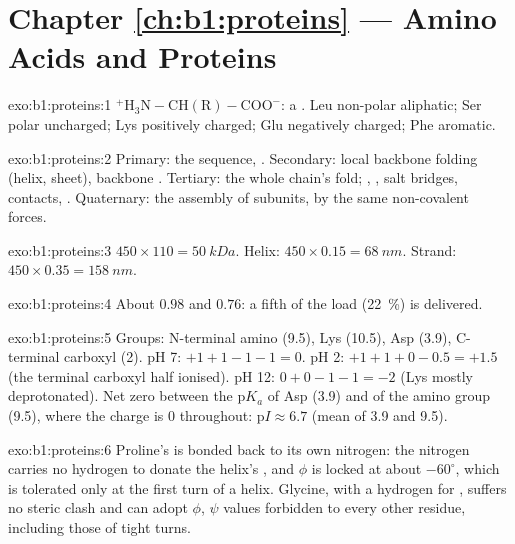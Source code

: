 \section*{Chapter \ref{ch:b1:proteins} --- Amino Acids and Proteins}

\begin{solution}{exo:b1:proteins:1}
$\mathrm{^+H_3N{-}CH(R){-}COO^-}$: a . Leu non-polar
aliphatic; Ser polar uncharged; Lys positively charged; Glu negatively
charged; Phe aromatic.
\end{solution}

\begin{solution}{exo:b1:proteins:2}
Primary: the sequence, . Secondary: local backbone
folding (helix, sheet), backbone . Tertiary: the whole
chain's fold; , , salt bridges,  contacts, . Quaternary: the assembly of
subunits, by the same non-covalent forces.
\end{solution}

\begin{solution}{exo:b1:proteins:3}
$450\times 110 = \qty{50}{kDa}$. Helix: $450\times 0.15 = \qty{68}{nm}$.
Strand: $450\times 0.35 = \qty{158}{nm}$.
\end{solution}

\begin{solution}{exo:b1:proteins:4}
About $0.98$ and $0.76$: a fifth of the load (\qty{22}{\%}) is
delivered.
\end{solution}

\begin{solution}{exo:b1:proteins:5}
Groups: N-terminal amino (9.5), Lys  (10.5), Asp 
(3.9), C-terminal carboxyl (2). pH 7: $+1 + 1 - 1 - 1 = 0$. pH 2:
$+1 + 1 + 0 - 0.5 = +1.5$ (the terminal carboxyl half ionised). pH
12: $0 + 0 - 1 - 1 = -2$ (Lys mostly deprotonated). Net zero between
the p$K_a$ of Asp (3.9) and of the amino group (9.5), where the charge
is $0$ throughout: p$I \approx 6.7$ (mean of 3.9 and 9.5).
\end{solution}

\begin{solution}{exo:b1:proteins:6}
Proline's  is bonded back to its own nitrogen: the nitrogen
carries no hydrogen to donate the helix's , and $\phi$ is
locked at about $-60^\circ$, which is tolerated only at the first turn
of a helix. Glycine, with a hydrogen for , suffers no steric
clash and can adopt $\phi$, $\psi$ values forbidden to every other
residue, including those of tight turns.
\end{solution}

